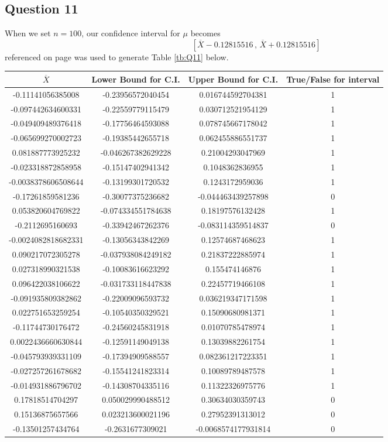\documentclass[10pt,a4paper,notitlepage]{article}
\begin{document}
\subsection*{\centering Question 11}
When we set $n=100$, our confidence interval for $\mu$ becomes 
\begin{equation}
\left[ \overline{X}-0.12815516 \, , \, \overline{X}+0.12815516\right]
\end{equation}
 referenced on page \pageref{cd:11.1} was used to generate Table \ref{tb:Q11} below. 
\begin{table}[H]
\centering
\begin{tabular}{|c|c|c|c|}
\hline $\overline{X}$ & Lower Bound for C.I. & Upper Bound for C.I. & True/False for interval\\
\hline -0.11141056385008 & -0.23956572040454 & 0.016744592704381 & 1\\ -0.097442634600331 & -0.22559779115479 & 0.030712521954129 & 1\\ -0.049409489376418 & -0.17756464593088 & 0.078745667178042 & 1\\ -0.065699270002723 & -0.19385442655718 & 0.062455886551737 & 1\\ 0.081887773925232 & -0.046267382629228 & 0.21004293047969 & 1\\ -0.023318872858958 & -0.15147402941342 & 0.1048362836955 & 1\\ -0.0038378606508644 & -0.13199301720532 & 0.1243172959036 & 1\\ -0.17261859581236 & -0.30077375236682 & -0.044463439257898 & 0\\ 0.053820604769822 & -0.074334551784638 & 0.18197576132428 & 1\\ -0.2112695160693 & -0.33942467262376 & -0.083114359514837 & 0\\ -0.0024082818682331 & -0.13056343842269 & 0.12574687468623 & 1\\ 0.090217072305278 & -0.037938084249182 & 0.21837222885974 & 1\\ 0.027318990321538 & -0.10083616623292 & 0.155474146876 & 1\\ 0.096422038106622 & -0.031733118447838 & 0.22457719466108 & 1\\ -0.091935809382862 & -0.22009096593732 & 0.036219347171598 & 1\\ 0.022751653259254 & -0.10540350329521 & 0.15090680981371 & 1\\ -0.11744730176472 & -0.24560245831918 & 0.01070785478974 & 1\\ 0.0022436660630844 & -0.12591149049138 & 0.13039882261754 & 1\\ -0.045793939331109 & -0.17394909588557 & 0.082361217223351 & 1\\ -0.027257261678682 & -0.15541241823314 & 0.10089789487578 & 1\\ -0.014931886796702 & -0.14308704335116 & 0.11322326975776 & 1\\ 0.17818514704297 & 0.050029990488512 & 0.30634030359743 & 0\\ 0.15136875657566 & 0.023213600021196 & 0.27952391313012 & 0\\ -0.13501257434764 & -0.2631677309021 & -0.0068574177931814 & 0\\ 
\end{tabular}
\end{table}
\end{document}
